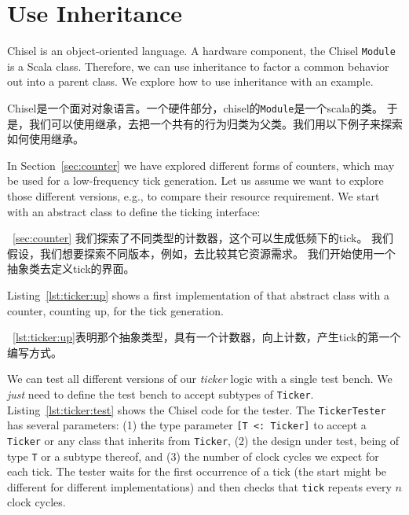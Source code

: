 \documentclass[%
    10pt,
    headinclude, footexclude,
    openright, %
    notitlepage,
    cleardoubleempty,
    headsepline,
    pointlessnumbers,
    bibtotoc, idxtotoc,
    ]{scrbook}
\newcommand{\code}[1]{{\small{\texttt{#1}}}}
\begin{document}

\section{Use Inheritance}
\label{sec:inheritance}

Chisel is an object-oriented language. A hardware component, the Chisel \code{Module}
is a Scala class. Therefore, we can use inheritance to factor a common behavior
out into a parent class. We explore how to use inheritance with an example.

Chisel是一个面对对象语言。一个硬件部分，chisel的\code{Module}是一个scala的类。
于是，我们可以使用继承，去把一个共有的行为归类为父类。我们用以下例子来探索如何使用继承。

In Section~\ref{sec:counter} we have explored different forms of counters,
which may be used for a low-frequency tick generation. Let us assume we want to
explore those different versions, e.g., to compare their resource requirement.
We start with an abstract class to define the ticking interface:

~\ref{sec:counter} 我们探索了不同类型的计数器，这个可以生成低频下的tick。
我们假设，我们想要探索不同版本，例如，去比较其它资源需求。
我们开始使用一个抽象类去定义tick的界面。


\noindent Listing~\ref{lst:ticker:up} shows a first implementation of that abstract class
with a counter, counting up, for the tick generation.

\noindent ~\ref{lst:ticker:up}表明那个抽象类型，具有一个计数器，向上计数，产生tick的第一个编写方式。


We can test all different versions of our \emph{ticker} logic with a single test bench.
We \emph{just} need to define the test bench to accept subtypes of \code{Ticker}.
Listing~\ref{lst:ticker:test} shows the Chisel code for the tester.
The \code{TickerTester} has several parameters: (1) the type parameter
\code{[T <: Ticker]} to accept a \code{Ticker} or any class that inherits from \code{Ticker},
(2) the design under test, being of type \code{T} or a subtype thereof,
and (3) the number of clock cycles we expect for each tick.
The tester waits for the first occurrence of a tick (the start might be different for
different implementations) and then checks that \code{tick} repeats every $n$ clock cycles.
\end{document}

